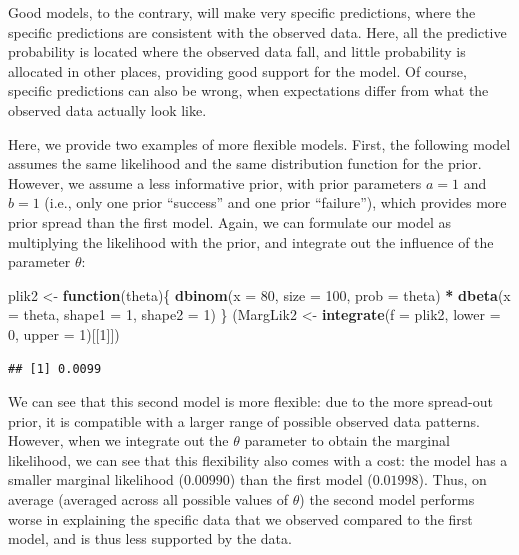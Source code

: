 \documentclass[12pt,]{krantz}
\newenvironment{Shaded}{\begin{snugshade}}{\end{snugshade}}
\newcommand{\ControlFlowTok}[1]{\textcolor[rgb]{0.13,0.29,0.53}{\textbf{#1}}}
\newcommand{\DataTypeTok}[1]{\textcolor[rgb]{0.13,0.29,0.53}{#1}}
\newcommand{\DecValTok}[1]{\textcolor[rgb]{0.00,0.00,0.81}{#1}}
\newcommand{\KeywordTok}[1]{\textcolor[rgb]{0.13,0.29,0.53}{\textbf{#1}}}
\newcommand{\NormalTok}[1]{#1}
\newcommand{\OperatorTok}[1]{\textcolor[rgb]{0.81,0.36,0.00}{\textbf{#1}}}
\newcommand{\StringTok}[1]{\textcolor[rgb]{0.31,0.60,0.02}{#1}}
\theoremstyle{definition}
\theoremstyle{definition}
\theoremstyle{definition}
\theoremstyle{remark}
\begin{document}
Good models, to the contrary, will make very specific predictions, where the specific predictions are consistent with the observed data. Here, all the predictive probability is located where the observed data fall, and little probability is allocated in other places, providing good support for the model. Of course, specific predictions can also be wrong, when expectations differ from what the observed data actually look like.

Here, we provide two examples of more flexible models. First, the following model assumes the same likelihood and the same distribution function for the prior. However, we assume a less informative prior, with prior parameters \(a = 1\) and \(b = 1\) (i.e., only one prior ``success'' and one prior ``failure''), which provides more prior spread than the first model. Again, we can formulate our model as multiplying the likelihood with the prior, and integrate out the influence of the parameter \(\theta\):

\begin{Shaded}
\begin{Highlighting}[]
\NormalTok{plik2 <-}\StringTok{ }\ControlFlowTok{function}\NormalTok{(theta)\{}
  \KeywordTok{dbinom}\NormalTok{(}\DataTypeTok{x =} \DecValTok{80}\NormalTok{, }\DataTypeTok{size =} \DecValTok{100}\NormalTok{, }\DataTypeTok{prob =}\NormalTok{ theta) }\OperatorTok{*}
\StringTok{    }\KeywordTok{dbeta}\NormalTok{(}\DataTypeTok{x =}\NormalTok{ theta, }\DataTypeTok{shape1 =} \DecValTok{1}\NormalTok{, }\DataTypeTok{shape2 =} \DecValTok{1}\NormalTok{)}
\NormalTok{\}}
\NormalTok{(MargLik2 <-}\StringTok{ }\KeywordTok{integrate}\NormalTok{(}\DataTypeTok{f =}\NormalTok{ plik2, }\DataTypeTok{lower =} \DecValTok{0}\NormalTok{, }\DataTypeTok{upper =} \DecValTok{1}\NormalTok{)[[}\DecValTok{1}\NormalTok{]])}
\end{Highlighting}
\end{Shaded}

\begin{verbatim}
## [1] 0.0099
\end{verbatim}

We can see that this second model is more flexible: due to the more spread-out prior, it is compatible with a larger range of possible observed data patterns. However, when we integrate out the \(\theta\) parameter to obtain the marginal likelihood, we can see that this flexibility also comes with a cost: the model has a smaller marginal likelihood (\(0.00990\)) than the first model (\(0.01998\)). Thus, on average (averaged across all possible values of \(\theta\)) the second model performs worse in explaining the specific data that we observed compared to the first model, and is thus less supported by the data.
\end{document}
